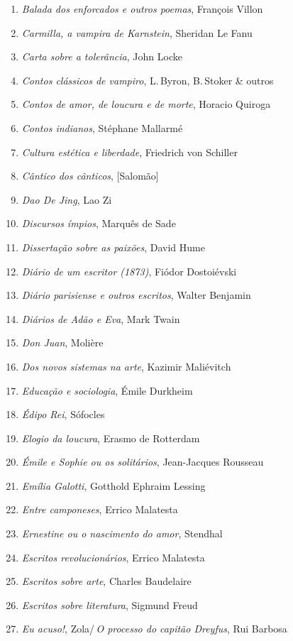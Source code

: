 \begin{enumerate}
\item \textit{Balada dos enforcados e outros poemas}, François Villon
\item \textit{Carmilla, a vampira de Karnstein}, Sheridan Le Fanu
\item \textit{Carta sobre a tolerância}, John Locke
\item \textit{Contos clássicos de vampiro}, L.\,Byron, B.\,Stoker \& outros
\item \textit{Contos de amor, de loucura e de morte}, Horacio Quiroga
\item \textit{Contos indianos}, Stéphane Mallarmé
\item \textit{Cultura estética e liberdade}, Friedrich von Schiller
\item \textit{Cântico dos cânticos}, [Salomão]
\item \textit{Dao De Jing}, Lao Zi
\item \textit{Discursos ímpios}, Marquês de Sade
\item \textit{Dissertação sobre as paixões}, David Hume
\item \textit{Diário de um escritor (1873)}, Fiódor Dostoiévski
\item \textit{Diário parisiense e outros escritos}, Walter Benjamin
\item \textit{Diários de Adão e Eva}, Mark Twain
\item \textit{Don Juan}, Molière
\item \textit{Dos novos sistemas na arte}, Kazimir Maliévitch
\item \textit{Educação e sociologia}, Émile Durkheim
\item \textit{Édipo Rei}, Sófocles
\item \textit{Elogio da loucura}, Erasmo de Rotterdam
\item \textit{Émile e Sophie ou os solitários}, Jean-Jacques Rousseau 
\item \textit{Emília Galotti}, Gotthold Ephraim Lessing
\item \textit{Entre camponeses}, Errico Malatesta
\item \textit{Ernestine ou o nascimento do amor}, Stendhal
\item \textit{Escritos revolucionários}, Errico Malatesta
\item \textit{Escritos sobre arte}, Charles Baudelaire
\item \textit{Escritos sobre literatura}, Sigmund Freud
\item \textit{Eu acuso!}, Zola/\,\textit{O processo do capitão Dreyfus}, Rui Barbosa

\end{enumerate}
